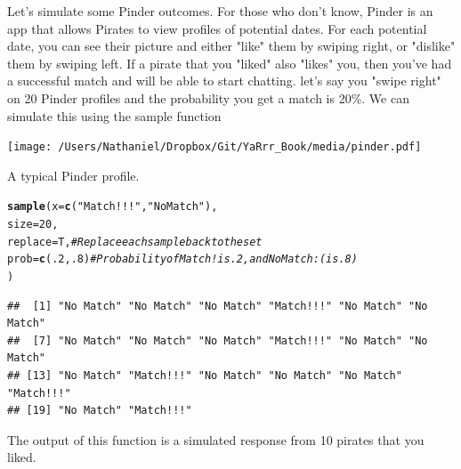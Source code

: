 \documentclass{tufte-book}\usepackage[]{graphicx}\usepackage[]{color}
\makeatletter
\newcommand{\hlnum}[1]{\textcolor[rgb]{0.686,0.059,0.569}{#1}}%
\newcommand{\hlstr}[1]{\textcolor[rgb]{0.192,0.494,0.8}{#1}}%
\newcommand{\hlcom}[1]{\textcolor[rgb]{0.678,0.584,0.686}{\textit{#1}}}%
\newcommand{\hlstd}[1]{\textcolor[rgb]{0.345,0.345,0.345}{#1}}%
\newcommand{\hlkwc}[1]{\textcolor[rgb]{0.333,0.667,0.333}{#1}}%
\newcommand{\hlkwd}[1]{\textcolor[rgb]{0.737,0.353,0.396}{\textbf{#1}}}%
\newenvironment{kframe}{%
 \def\at@end@of@kframe{}%
 \ifinner\ifhmode%
  \def\at@end@of@kframe{\end{minipage}}%
  \begin{minipage}{\columnwidth}%
 \fi\fi%
 \def\FrameCommand##1{\hskip\@totalleftmargin \hskip-\fboxsep
 \colorbox{shadecolor}{##1}\hskip-\fboxsep
     \hskip-\linewidth \hskip-\@totalleftmargin \hskip\columnwidth}%
 \MakeFramed {\advance\hsize-\width
   \@totalleftmargin\z@ \linewidth\hsize
   \@setminipage}}%
 {\par\unskip\endMakeFramed%
 \at@end@of@kframe}
\newenvironment{knitrout}{}{} %
\makeatother
\begin{document}
Let's simulate some Pinder outcomes. For those who don't know, Pinder is an app that allows Pirates to view profiles of potential dates. For each potential date, you can see their picture and either "like" them by swiping right, or "dislike" them by swiping left. If a pirate that you "liked" also "likes" you, then you've had a successful match and will be able to start chatting. let's say you "swipe right" on 20 Pinder profiles and the probability you get a match is 20\%. We can simulate this using the sample function

\begin{marginfigure}
\texttt{[image: /Users/Nathaniel/Dropbox/Git/YaRrr\_Book/media/pinder.pdf]}
\caption{A typical Pinder profile.}
\label{fig:pinder}
\end{marginfigure}

\begin{footnotesize}
\begin{knitrout}
\color{fgcolor}\begin{kframe}
\begin{alltt}
\hlkwd{sample}\hlstd{(}\hlkwc{x} \hlstd{=} \hlkwd{c}\hlstd{(}\hlstr{"Match!!!"}\hlstd{,} \hlstr{"No Match"}\hlstd{),}
       \hlkwc{size} \hlstd{=} \hlnum{20}\hlstd{,}
       \hlkwc{replace} \hlstd{= T,} \hlcom{# Replace each sample back to the set}
       \hlkwc{prob} \hlstd{=} \hlkwd{c}\hlstd{(}\hlnum{.2}\hlstd{,} \hlnum{.8}\hlstd{)}  \hlcom{# Probability of Match! is .2, and No Match :( is .8)}
       \hlstd{)}
\end{alltt}
\begin{verbatim}
##  [1] "No Match" "No Match" "No Match" "Match!!!" "No Match" "No Match"
##  [7] "No Match" "No Match" "No Match" "Match!!!" "No Match" "No Match"
## [13] "No Match" "Match!!!" "No Match" "No Match" "No Match" "Match!!!"
## [19] "No Match" "Match!!!"
\end{verbatim}
\end{kframe}
\end{knitrout}
\end{footnotesize}

The output of this function is a simulated response from 10 pirates that you liked.

\end{document}
